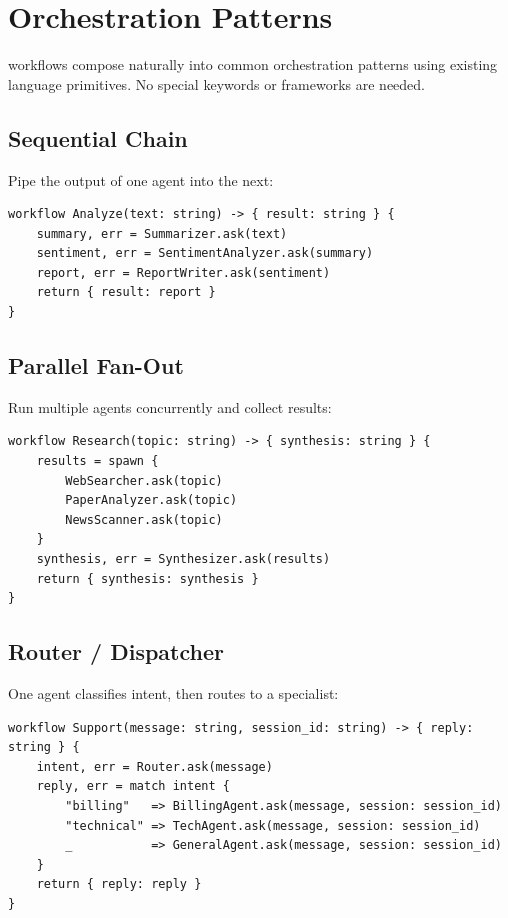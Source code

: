 \section{Orchestration Patterns}

\haira{} workflows compose naturally into common orchestration patterns using existing language primitives. No special keywords or frameworks are needed.

\subsection{Sequential Chain}

Pipe the output of one agent into the next:

\begin{lstlisting}
workflow Analyze(text: string) -> { result: string } {
    summary, err = Summarizer.ask(text)
    sentiment, err = SentimentAnalyzer.ask(summary)
    report, err = ReportWriter.ask(sentiment)
    return { result: report }
}
\end{lstlisting}

\subsection{Parallel Fan-Out}

Run multiple agents concurrently and collect results:

\begin{lstlisting}
workflow Research(topic: string) -> { synthesis: string } {
    results = spawn {
        WebSearcher.ask(topic)
        PaperAnalyzer.ask(topic)
        NewsScanner.ask(topic)
    }
    synthesis, err = Synthesizer.ask(results)
    return { synthesis: synthesis }
}
\end{lstlisting}

\subsection{Router / Dispatcher}

One agent classifies intent, then  routes to a specialist:

\begin{lstlisting}
workflow Support(message: string, session_id: string) -> { reply: string } {
    intent, err = Router.ask(message)
    reply, err = match intent {
        "billing"   => BillingAgent.ask(message, session: session_id)
        "technical" => TechAgent.ask(message, session: session_id)
        _           => GeneralAgent.ask(message, session: session_id)
    }
    return { reply: reply }
}
\end{lstlisting}

